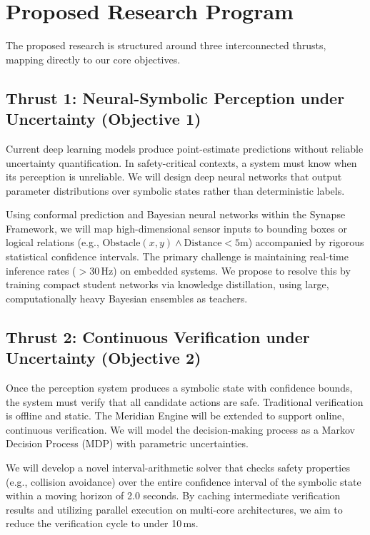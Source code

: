 \section{Proposed Research Program}
The proposed research is structured around three interconnected thrusts, mapping directly to our core objectives.

\subsection{Thrust 1: Neural-Symbolic Perception under Uncertainty (Objective 1)}
Current deep learning models produce point-estimate predictions without reliable uncertainty quantification. In safety-critical contexts, a system must know when its perception is unreliable. We will design deep neural networks that output parameter distributions over symbolic states rather than deterministic labels. 

Using conformal prediction and Bayesian neural networks within the Synapse Framework, we will map high-dimensional sensor inputs to bounding boxes or logical relations (e.g., $\text{Obstacle}(x, y) \land \text{Distance} < 5\text{m}$) accompanied by rigorous statistical confidence intervals. The primary challenge is maintaining real-time inference rates ($>30$\,Hz) on embedded systems. We propose to resolve this by training compact student networks via knowledge distillation, using large, computationally heavy Bayesian ensembles as teachers.

\subsection{Thrust 2: Continuous Verification under Uncertainty (Objective 2)}
Once the perception system produces a symbolic state with confidence bounds, the system must verify that all candidate actions are safe. Traditional verification is offline and static. The Meridian Engine will be extended to support online, continuous verification. We will model the decision-making process as a Markov Decision Process (MDP) with parametric uncertainties. 

We will develop a novel interval-arithmetic solver that checks safety properties (e.g., collision avoidance) over the entire confidence interval of the symbolic state within a moving horizon of 2.0 seconds. By caching intermediate verification results and utilizing parallel execution on multi-core architectures, we aim to reduce the verification cycle to under 10\,ms.

